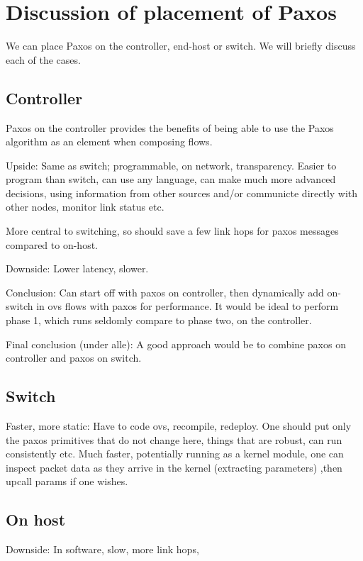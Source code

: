 \section{Discussion of placement of Paxos}

We can place Paxos on the controller, end-host or switch. We will briefly
discuss each of the cases.

\subsection{Controller}

Paxos on the controller provides the benefits of being able to use the Paxos
algorithm as an element when composing flows.

Upside: Same as switch; programmable, on network, transparency.
Easier to program than switch, can use any language, can make much more
advanced decisions, using information from other sources and/or communicte
directly with other nodes, monitor link status etc.

More central to switching, so should save a few link hops for paxos messages
compared to on-host.

Downside: Lower latency, slower.

Conclusion: Can start off with paxos on controller, then dynamically add
on-switch in ovs flows with paxos for performance. It would be ideal to
perform phase 1, which runs seldomly compare to phase two, on the
controller.

Final conclusion (under alle): A good approach would be to combine paxos on
controller and paxos on switch.

\subsection{Switch}

Faster, more static: Have to code ovs, recompile, redeploy. One should put
only the paxos primitives that do not change here, things that are robust,
can run consistently etc. Much faster, potentially running as a kernel
module, one can inspect packet data as they arrive in the kernel
(extracting parameters) ,then upcall params if one wishes.


\subsection{On host}

Downside: In software, slow, more link hops, 

